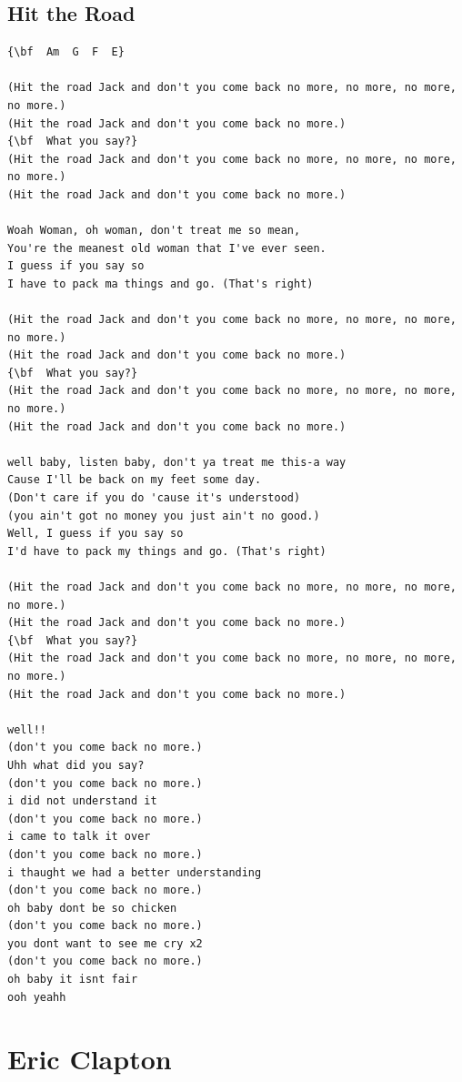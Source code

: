 \documentclass[a4paper]{article}
\begin{document}
\subsection{Hit the Road}
\begin{Verbatim}[commandchars=\\\{\}]
{\bf  Am  G  F  E}

(Hit the road Jack and don't you come back no more, no more, no more, no more.)
(Hit the road Jack and don't you come back no more.)
{\bf  What you say?}
(Hit the road Jack and don't you come back no more, no more, no more, no more.)
(Hit the road Jack and don't you come back no more.)

Woah Woman, oh woman, don't treat me so mean,
You're the meanest old woman that I've ever seen.
I guess if you say so
I have to pack ma things and go. (That's right)

(Hit the road Jack and don't you come back no more, no more, no more, no more.)
(Hit the road Jack and don't you come back no more.)
{\bf  What you say?}
(Hit the road Jack and don't you come back no more, no more, no more, no more.)
(Hit the road Jack and don't you come back no more.)

well baby, listen baby, don't ya treat me this-a way
Cause I'll be back on my feet some day.
(Don't care if you do 'cause it's understood)
(you ain't got no money you just ain't no good.)
Well, I guess if you say so
I'd have to pack my things and go. (That's right)

(Hit the road Jack and don't you come back no more, no more, no more, no more.)
(Hit the road Jack and don't you come back no more.)
{\bf  What you say?}
(Hit the road Jack and don't you come back no more, no more, no more, no more.)
(Hit the road Jack and don't you come back no more.)

well!!
(don't you come back no more.)
Uhh what did you say?
(don't you come back no more.)
i did not understand it
(don't you come back no more.)
i came to talk it over
(don't you come back no more.)
i thaught we had a better understanding
(don't you come back no more.)
oh baby dont be so chicken
(don't you come back no more.)
you dont want to see me cry x2
(don't you come back no more.)
oh baby it isnt fair
ooh yeahh

\end{Verbatim}
\newpage
\section{Eric Clapton}
\end{document}
